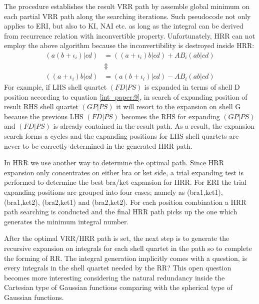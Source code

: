 The procedure establishes the result VRR path by assemble global minimum on each partial VRR
path along the searching iterations. Such pseudocode not only applies to ERI, but also to
KI, NAI etc. as long as the integral can be derived from recurrence relation with inconvertible
property. Unfortunately, HRR can not employ the above algorithm because the inconvertibility 
is destroyed inside HRR:
\begin{align}
\label{int_paper:9}
 (a(b+\iota_{i})|cd) &= ((a+\iota_{i})b|cd) + AB_{i}(ab|cd)   \nonumber \\
                     &\Updownarrow                            \nonumber \\
 ((a+\iota_{i})b|cd) &= (a(b+\iota_{i})|cd) - AB_{i}(ab|cd)   
\end{align}
For example, if LHS shell quartet $(FD|PS)$ is expanded in terms of shell D position according 
to equation \ref{int_paper:9}, in search of expanding position of result RHS shell quartet $(GP|PS)$
it will resort to the expansion on shell G because the previous LHS $(FD|PS)$ becomes the RHS for
expanding $(GP|PS)$ and $(FD|PS)$ is already contained in the result path. As a result, the expansion 
search forms a cycles and the expanding positions for LHS shell quartets are never to be correctly 
determined in the generated HRR path.

In HRR we use another way to determine the optimal path. Since HRR expansion only concentrates on
either bra or ket side, a trial expanding test is performed to determine the best bra/ket 
expansion for HRR. For ERI the trial expanding positions are grouped into four cases; namely 
as (bra1,ket1), (bra1,ket2), (bra2,ket1) and (bra2,ket2). For each position combination a HRR 
path searching is conducted and the final HRR path picks up the one which generates the minimum
integral number.

After the optimal VRR/HRR path is set, the next step is to generate the recursive expansion on 
integrals for each shell quartet in the path so to complete the forming of RR. The integral
generation implicitly comes with a question, is every integrals in the shell quartet needed
by the RR? This open question becomes more interesting considering the natural redundancy 
inside the Cartesian type of Gaussian functions comparing with the spherical type of Gaussian
functions.

